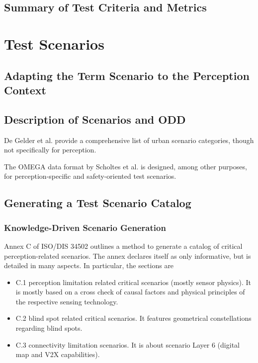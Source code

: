\documentclass[conference]{IEEEtran}
\begin{document}
\subsection{Summary of Test Criteria and Metrics}

\section{Test Scenarios}
\label{sec:axis_test_scenarios}
\subsection{Adapting the Term Scenario to the Perception Context}
\label{sec:what_are_perc_scenarios}

\subsection{Description of Scenarios and ODD}
\label{sec:describing_scenarios_odd}

De Gelder et al. \cite{DeGelder2020categories} provide a comprehensive list of urban scenario categories, though not specifically for perception. 

The OMEGA data format by Scholtes et al. \cite{Scholtes2022omega} is designed, among other purposes, for perception-specific and safety-oriented test scenarios.

\subsection{Generating a Test Scenario Catalog}
\label{sec:scenarios_obtaining}


\subsubsection{Knowledge-Driven Scenario Generation} 
\label{sec:scenario_gen_knowledge_driven}

Annex C of ISO/DIS 34502 \cite{ISO_DIS_34502_2021} outlines a method to generate a catalog of critical perception-related scenarios.
The annex declares itself as only informative, but is detailed in many aspects. 
In particular, the sections are 
\begin{itemize}
\item C.1 perception limitation related critical scenarios (mostly sensor physics). It is mostly based on a cross check of causal factors and physical principles of the respective sensing technology. 
\item C.2 blind spot related critical scenarios. It features geometrical constellations regarding blind spots.
\item C.3 connectivity limitation scenarios. It is about scenario Layer 6 (digital map and V2X capabilities).
\end{itemize}
\end{document}
